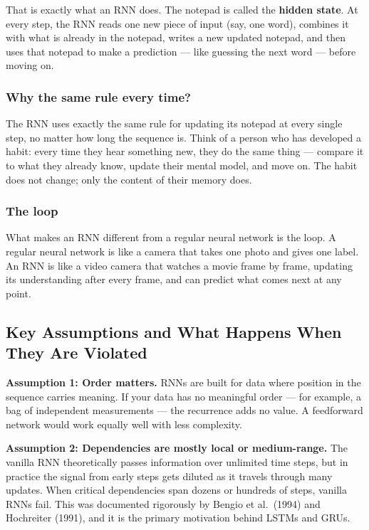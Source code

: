 That is exactly what an RNN does. The notepad is called the \textbf{hidden state}.
At every step, the RNN reads one new piece of input (say, one word), combines it with
what is already in the notepad, writes a new updated notepad, and then uses that notepad
to make a prediction --- like guessing the next word --- before moving on.

\subsubsection{Why the same rule every time?}

The RNN uses exactly the same rule for updating its notepad at every single step,
no matter how long the sequence is. Think of a person who has developed a habit: every
time they hear something new, they do the same thing --- compare it to what they already
know, update their mental model, and move on. The habit does not change; only the
content of their memory does.

\subsubsection{The loop}

What makes an RNN different from a regular neural network is the loop.
A regular neural network is like a camera that takes one photo and gives one label.
An RNN is like a video camera that watches a movie frame by frame, updating its
understanding after every frame, and can predict what comes next at any point.

\subsection{Key Assumptions and What Happens When They Are Violated}

\textbf{Assumption 1: Order matters.}
RNNs are built for data where position in the sequence carries meaning. If your data has
no meaningful order --- for example, a bag of independent measurements --- the recurrence
adds no value. A feedforward network would work equally well with less complexity.

\textbf{Assumption 2: Dependencies are mostly local or medium-range.}
The vanilla RNN theoretically passes information over unlimited time steps, but in
practice the signal from early steps gets diluted as it travels through many updates.
When critical dependencies span dozens or hundreds of steps, vanilla RNNs fail.
This was documented rigorously by Bengio et al.\ (1994) and Hochreiter (1991), and
it is the primary motivation behind LSTMs and GRUs.

